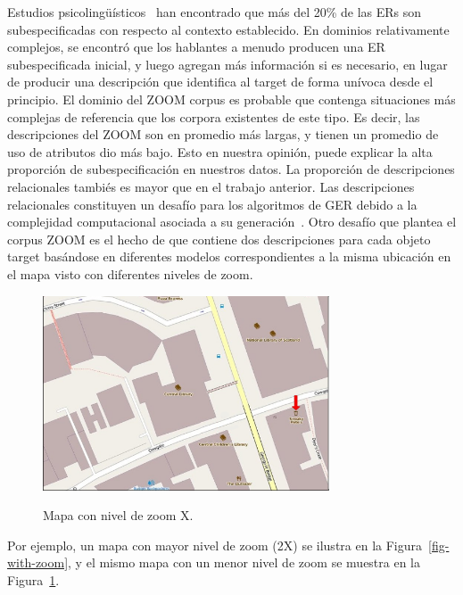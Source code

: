 Estudios psicoling\"u\'{i}sticos~\cite{Clark1986} han encontrado que m\'as del 20\% de las ERs son subespecificadas con respecto al contexto establecido. En dominios relativamente complejos, se encontr\'o que los hablantes a menudo producen una ER subespecificada inicial, y luego agregan m\'as informaci\'on si es necesario, en lugar de producir una descripci\'on que identifica al target de forma un\'{i}voca desde el principio. El dominio del ZOOM corpus es probable que contenga situaciones m\'as complejas de referencia que los corpora existentes de este tipo. Es decir, las descripciones del ZOOM son en promedio m\'as largas, y tienen un promedio de uso de atributos dio m\'as bajo. Esto en nuestra opini\'on, puede explicar la alta proporci\'on de subespecificaci\'on en nuestros datos. La proporci\'on de descripciones relacionales tambi\'es es mayor que en el trabajo anterior. Las descripciones relacionales constituyen un desaf\'{i}o para los algoritmos de GER debido a la complejidad computacional asociada a su generaci\'on~\cite{survey}. Otro desaf\'{i}o que plantea el corpus ZOOM es el hecho de que contiene dos descripciones para cada objeto target bas\'andose en diferentes modelos correspondientes a la misma ubicaci\'on en el mapa visto con diferentes niveles de zoom. 
\begin{figure}[ht]
\begin{center}
\includegraphics[width=8.5cm]{images/interface2-b.png}\\[0pt]
\caption{Mapa con nivel de zoom X.}
\label{interface2}
\end{center}
\end{figure}
Por ejemplo, un mapa con mayor nivel de zoom (2X) se ilustra en la Figura~\ref{fig-with-zoom}, y el mismo mapa con un menor nivel de zoom se muestra en la Figura~\ref{interface2}.


